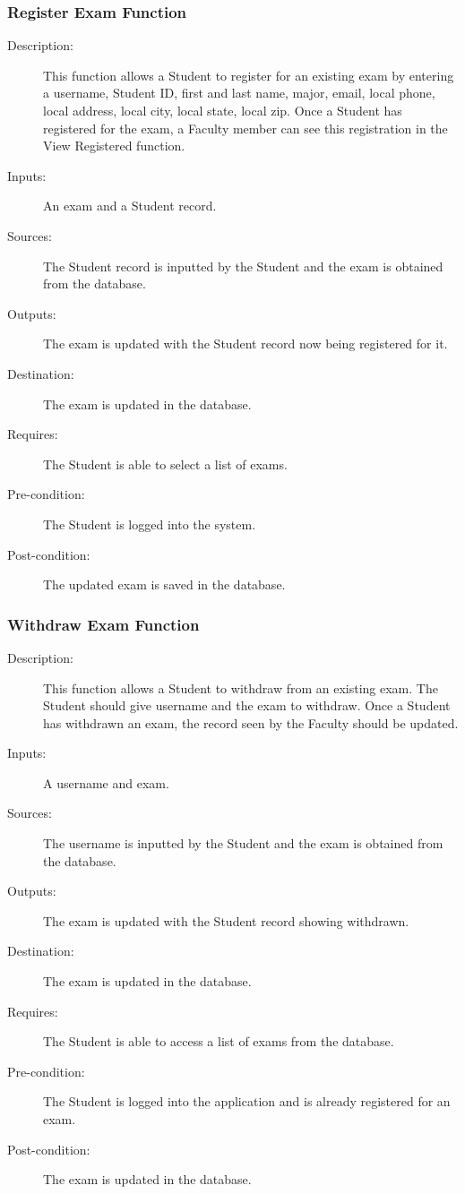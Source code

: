 \subsubsection{\large Register Exam Function} 
\begin{boxed} %
\small\begin{description}
\item[Description:]
   This function allows a Student to register for an existing exam by entering a
   username, Student ID, first and last name, major, email, local phone, local
   address, local city, local state, local zip.  Once a Student has registered
   for the exam, a Faculty member can see this registration in the View
   Registered function.
\item[Inputs:]
   An exam and a Student record.
\item[Sources:]
   The Student record is inputted by the Student and the exam is
   obtained from the database.
\item[Outputs:]
   The exam is updated with the Student record now being registered for
   it.
\item[Destination:]
   The exam is updated in the database.
\item[Requires:]
   The Student is able to select a list of exams.
\item[Pre-condition:]
   The Student is logged into the system.
\item[Post-condition:]
   The updated exam is saved in the database.
\end{description}
\normalsize
\end{boxed} %

\subsubsection{\large Withdraw Exam Function} 
\begin{boxed} %
\small\begin{description}
\item[Description:]
   This function allows a Student to withdraw from an existing exam. The Student
   should give username and the exam to withdraw. Once a Student has withdrawn
   an exam, the record seen by the Faculty should be updated.
\item[Inputs:]
   A username and exam.
\item[Sources:]
   The username is inputted by the Student and the exam is obtained from
   the database.
\item[Outputs:]
   The exam is updated with the Student record showing withdrawn.
\item[Destination:]
   The exam is updated in the database.
\item[Requires:]
   The Student is able to access a list of exams from the database.
\item[Pre-condition:]
   The Student is logged into the application and is already registered for an
   exam.
\item[Post-condition:]
   The exam is updated in the database.
\end{description}
\normalsize
\end{boxed} %

